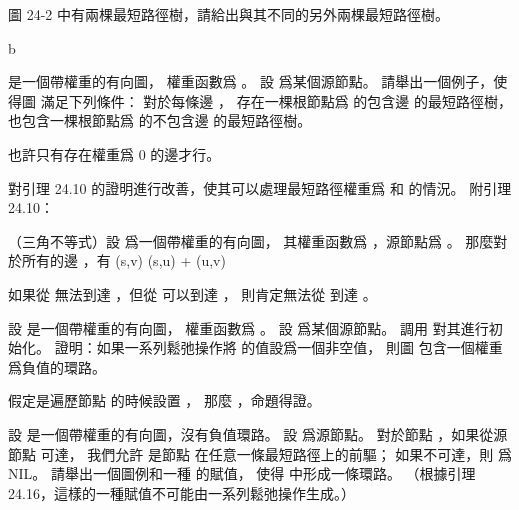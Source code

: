 \startsection[
  title={Proofs of shortest-paths properties},
]

\startEXERCISE
圖 24-2 中有兩棵最短路徑樹，請給出與其不同的另外兩棵最短路徑樹。
\stopEXERCISE

\startANSWER
{}
{\externalfigure[output/e24_5_1-2]}{b}
\stopcombination
\stopANSWER

\startEXERCISE
{} 是一個帶權重的有向圖，
權重函數爲 。
設  爲某個源節點。
請舉出一個例子，使得圖  滿足下列條件：
對於每條邊 ，
存在一棵根節點爲  的包含邊  的最短路徑樹，
也包含一棵根節點爲  的不包含邊  的最短路徑樹。
\stopEXERCISE

\startANSWER
也許只有存在權重爲 0 的邊才行。

\externalfigure[output/e24_5_2-1]
\stopANSWER

\startEXERCISE
對引理 24.10 的證明進行改善，使其可以處理最短路徑權重爲 \m{\infty} 和 \m{-\infty} 的情況。
附引理 24.10：

（三角不等式）設  爲一個帶權重的有向圖，
其權重函數爲 ，源節點爲 。
那麼對於所有的邊 ，有
\startformula
\delta(s,v) \le \delta(s,u) + \omega(u,v)
\stopformula
\stopEXERCISE

\startANSWER
如果從  無法到達 ，但從  可以到達 ，
則肯定無法從  到達 。

\stopANSWER

\startEXERCISE
設  是一個帶權重的有向圖，
權重函數爲 。
設  爲某個源節點。
調用  對其進行初始化。
證明：如果一系列鬆弛操作將  的值設爲一個非空值，
則圖  包含一個權重爲負值的環路。
\stopEXERCISE

\startANSWER
假定是遍歷節點  的時候設置 ，
那麼 ，命題得證。
\stopANSWER

\startEXERCISE
設  是一個帶權重的有向圖，沒有負值環路。
設  爲源節點。
對於節點 ，如果從源節點  可達，
我們允許  是節點  在任意一條最短路徑上的前驅；
如果不可達，則  爲 NIL。
請舉出一個圖例和一種 \m{\pi} 的賦值，
使得  中形成一條環路。
（根據引理 24.16，這樣的一種賦值不可能由一系列鬆弛操作生成。）
\stopEXERCISE

\startANSWER
\externalfigure[output/e24_5_5-1]
\stopANSWER

